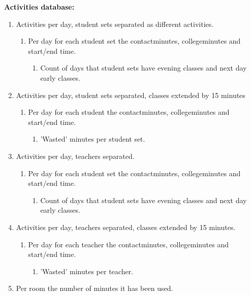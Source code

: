 \textbf{Activities database:}
\begin{enumerate}
	\item Activities per day, student sets separated as different activities.
	\begin{enumerate}
		\item Per day for each student set the contactminutes, collegeminutes and start/end time.
		\begin{enumerate}
			\item Count of days that student sets have evening classes and next day early classes.
		\end{enumerate}
	\end{enumerate}
	\item Activities per day, student sets separated, classes extended by 15 minutes
	\begin{enumerate}
		\item Per day for each student the contactminutes, collegeminutes and start/end time.
		\begin{enumerate}
			\item 'Wasted' minutes per student set.
		\end{enumerate}
	\end{enumerate}
	\item Activities per day, teachers separated.
	\begin{enumerate}
		\item Per day for each student set the contactminutes, collegeminutes and start/end time.
		\begin{enumerate}
			\item Count of days that student sets have evening classes and next day early classes.
		\end{enumerate}
	\end{enumerate}
	\item Activities per day, teachers separated, classes extended by 15 minutes.
	\begin{enumerate}
		\item Per day for each teacher the contactminutes, collegeminutes and start/end time.
		\begin{enumerate}
			\item 'Wasted' minutes per teacher.
		\end{enumerate}
	\end{enumerate}
	\item Per room the number of minutes it has been used.
\end{enumerate}

